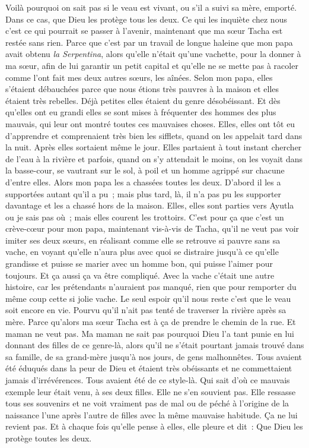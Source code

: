 \pend
%
\pstart
	Voilà pourquoi on sait pas si le veau est vivant, ou s’il a suivi sa mère, emporté. Dans ce cas, que Dieu les protège tous les deux.
\pend
%
\pstart
	Ce qui les inquiète chez nous c’est ce qui pourrait se passer à l’avenir, maintenant que ma sœur Tacha est restée sans rien. Parce que c’est par un travail de longue haleine que mon papa avait obtenu \textit{la Serpentina}, alors qu’elle n’était qu’une vachette, pour la donner à ma sœur, afin de lui garantir un petit capital et qu’elle ne se mette pas à racoler comme l’ont fait mes deux autres sœurs, les aînées.
\pend
%
\pstart
	Selon mon papa, elles s’étaient débauchées parce que nous étions très pauvres à la maison et elles étaient très rebelles. Déjà petites elles étaient du genre désobéissant. Et dès qu’elles ont eu grandi elles se sont mises à fréquenter des hommes des plus mauvais, qui leur ont montré toutes ces mauvaises choses. Elles, elles ont tôt eu d’apprendre et comprenaient très bien les sifflets, quand on les appelait tard dans la nuit. Après elles sortaient même le jour. Elles partaient à tout instant chercher de l’eau à la rivière et parfois, quand on s’y attendait le moins, on les voyait dans la basse-cour, se vautrant sur le sol, à poil et un homme agrippé sur chacune d’entre elles.
\pend
%
\pstart
	Alors mon papa les a chassées toutes les deux. D’abord il les a supportées autant qu’il a pu ; mais plus tard, là, il n’a pas pu les supporter davantage et les a chassé hors de la maison. Elles, elles sont parties vers Ayutla ou je sais pas où ; mais elles courent les trottoirs.
\pend
%
\pstart
	C’est pour ça que c’est un crève-cœur pour mon papa, maintenant vis-à-vis de Tacha, qu’il ne veut pas voir imiter ses deux sœurs, en réalisant comme elle se retrouve si pauvre sans sa vache, en voyant qu’elle n’aura plus avec quoi se distraire jusqu’à ce qu’elle grandisse et puisse se marier avec un homme bon, qui puisse l’aimer pour toujours. Et ça aussi ça va être compliqué. Avec la vache c’était une autre histoire, car les prétendants n’auraient pas manqué, rien que pour remporter du même coup cette si jolie vache.
\pend
%
\pstart
	Le seul espoir qu’il nous reste c’est que le veau soit encore en vie. Pourvu qu’il n’ait pas tenté de traverser la rivière après sa mère. Parce qu’alors ma sœur Tacha est à ça de prendre le chemin de la rue. Et maman ne veut pas.
\pend
%
\pstart
	Ma maman ne sait pas pourquoi Dieu l’a tant punie en lui donnant des filles de ce genre-là, alors qu’il ne s’était pourtant jamais trouvé dans sa famille, de sa grand-mère jusqu’à nos jours, de gens malhonnêtes. Tous avaient été éduqués dans la peur de Dieu et étaient très obéissants et ne commettaient jamais d’irrévérences. Tous avaient été de ce style-là. Qui sait d’où ce mauvais exemple leur était venu, à ses deux filles. Elle ne s’en souvient pas. Elle ressasse tous ses souvenirs et ne voit vraiment pas de mal ou de péché à l’origine de la naissance l’une après l’autre de filles avec la même mauvaise habitude. Ça ne lui revient pas. Et à chaque fois qu’elle pense à elles, elle pleure et dit : \og{}Que Dieu les protège toutes les deux.\fg
